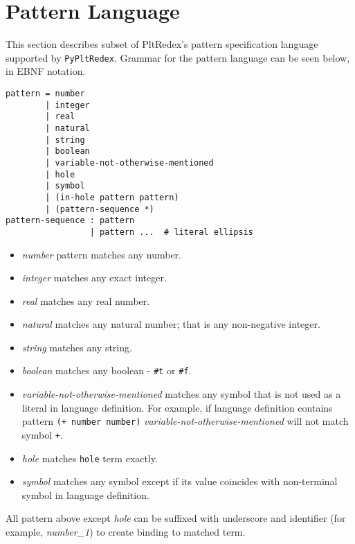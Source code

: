 \section{Pattern Language}

This section describes subset of PltRedex's pattern specification language supported by \texttt{PyPltRedex}. Grammar for the pattern language can be seen below, in EBNF notation. 

\begin{lstlisting}
pattern = number 
        | integer 
		| real 
		| natural 
		| string 
		| boolean 
		| variable-not-otherwise-mentioned 
		| hole 
		| symbol
        | (in-hole pattern pattern)
        | (pattern-sequence *) 
pattern-sequence : pattern 
                 | pattern ...  # literal ellipsis
\end{lstlisting}

\begin{itemize}
\item
\textit{number} pattern matches any number.

\item
\textit{integer} matches any exact integer. 

\item
\textit{real} matches any real number.

\item
\textit{natural} matches any natural number; that is any non-negative integer.

\item
\textit{string} matches any string.

\item
\textit{boolean} matches any boolean - \texttt{\#t} or \texttt{\#f}.
\item
\textit{variable-not-otherwise-mentioned} matches any symbol that is not used as a literal in language definition. For example, if language definition contains pattern \texttt{(+ number number)} \textit{variable-not-otherwise-mentioned} will not match symbol \texttt{+}.

\item
\textit{hole} matches \texttt{hole} term exactly.

\item
\textit{symbol} matches any symbol except if its value coincides with non-terminal symbol in language definition.
\end{itemize}

All pattern above except \textit{hole} can be suffixed with underscore and identifier (for example, \textit{number\_1}) to create binding to matched term.

